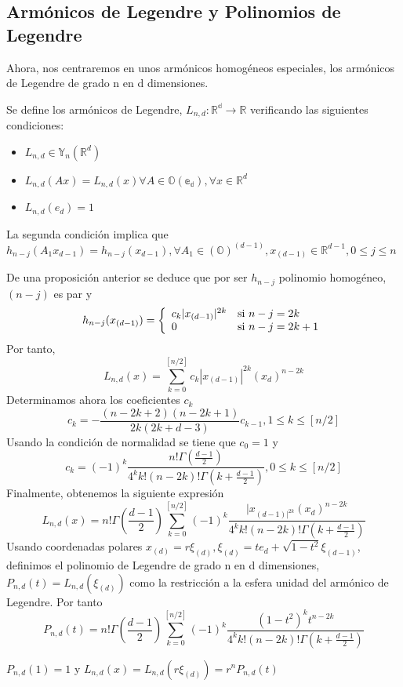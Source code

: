 \subsection{Armónicos de Legendre y Polinomios de Legendre}
Ahora, nos centraremos en unos armónicos homogéneos especiales, los armónicos de Legendre de grado n en d dimensiones.
\begin{defn}
	Se define los armónicos de Legendre, $L_{n,d}:\mathds{R^d}\to\mathds{R}$ verificando las siguientes condiciones:
	\begin{itemize}
		\item $L_{n,d} \in \mathds{Y}_n(\mathds{R}^d)$ 
		\item $L_{n,d}(Ax) = L_{n,d}(x)   \forall A \in \mathds{O(e_d)}, \forall x \in \mathds{R}^d$ 
		\item $L_{n,d}(e_d) = 1$
	\end{itemize}
\end{defn}
\begin{rem}
La segunda condición implica que $h_{n-j}(A_1x_{d-1})=h_{n-j}(x_{d-1}), \forall A_1\in \mathds{(O)}^{(d-1)},x_{(d-1)}\in\mathds{R}^{d-1},0\le j\le n$
\end{rem}
De una proposición anterior%
se deduce que por ser $h_{n-j}$ polinomio homogéneo,$(n-j)$ es par y 
\begin{equation}
h_{n-j}(x_{(d-1)}) = \left\lbrace
\begin{array}{ll}
c_k|x_{(d-1)}|^{2k} & \textup{si } n-j=2k \\
0 & \textup{si } n-j=2k+1
\end{array}
\right.
\end{equation}
Por tanto,
$$
L_{n,d}(x) = \sum_{k=0}^{[n/2]} c_k|x_{(d-1)}|^{2k}(x_d)^{n-2k}
$$
Determinamos ahora los coeficientes $c_k$
$$
c_k = - \frac{(n-2k+2)(n-2k+1)}{2k(2k+d-3)}c_{k-1}, 1\le k \le [n/2]
$$
Usando la condición de normalidad se tiene que $c_0 = 1$ y $$
c_k = (-1)^k \frac{n!\Gamma(\frac{d-1}{2})}{4^kk!(n-2k)!\Gamma(k+\frac{d-1}{2})}, 0\le k \le [n/2]
$$
Finalmente, obtenemos la siguiente expresión 
$$
L_{n,d}(x) = n!\Gamma(\frac{d-1}{2})\sum_{k=0}^{[n/2]}(-1)^k\frac{|x_{(d-1)|^{2k}}(x_d)^{n-2k}}{4^kk!(n-2k)!\Gamma(k+\frac{d-1}{2})}
$$
Usando coordenadas polares $x_{(d)}=r\xi_{(d)},\xi_{(d)} = te_d+\sqrt{1-t^2}\xi_{(d-1)}$, definimos el polinomio de Legendre de grado n en d dimensiones, $P_{n,d}(t) = L_{n,d}(\xi_{(d)})$ como la restricción a la esfera unidad del armónico de Legendre. Por tanto $$
P_{n,d}(t)=n!\Gamma(\frac{d-1}{2})\sum_{k=0}^{[n/2]}(-1)^k\frac{(1-t^2)^{k}t^{n-2k}}{4^kk!(n-2k)!\Gamma(k+\frac{d-1}{2})}
$$
\begin{rem}
$P_{n,d}(1)=1$ y $L_{n,d}(x) = L_{n,d}(r\xi_{(d)}) = r^nP_{n,d}(t)$
\end{rem}
